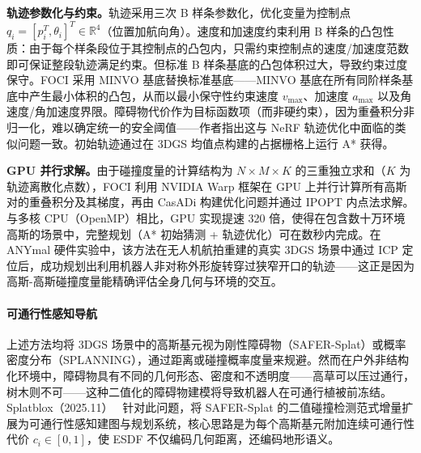 \textbf{轨迹参数化与约束。}轨迹采用三次 B 样条参数化，优化变量为控制点 $q_i = [p_i^T, \theta_i]^T \in \mathbb{R}^4$（位置加航向角）。速度和加速度约束利用 B 样条的凸包性质：由于每个样条段位于其控制点的凸包内，只需约束控制点的速度/加速度范数即可保证整段轨迹满足约束。但标准 B 样条基底的凸包体积过大，导致约束过度保守。FOCI 采用 MINVO 基底替换标准基底——MINVO 基底在所有同阶样条基底中产生最小体积的凸包，从而以最小保守性约束速度 $v_{\max}$、加速度 $a_{\max}$ 以及角速度/角加速度界限。障碍物代价作为目标函数项（而非硬约束），因为重叠积分非归一化，难以确定统一的安全阈值——作者指出这与 NeRF 轨迹优化中面临的类似问题一致。初始轨迹通过在 3DGS 均值点构建的占据栅格上运行 A* 获得。

\textbf{GPU 并行求解。}由于碰撞度量的计算结构为 $N \times M \times K$ 的三重独立求和（$K$ 为轨迹离散化点数），FOCI 利用 NVIDIA Warp 框架在 GPU 上并行计算所有高斯对的重叠积分及其梯度，再由 CasADi 构建优化问题并通过 IPOPT 内点法求解。与多核 CPU（OpenMP）相比，GPU 实现提速 320 倍，使得在包含数十万环境高斯的场景中，完整规划（A* 初始猜测 + 轨迹优化）可在数秒内完成。在 ANYmal 硬件实验中，该方法在无人机航拍重建的真实 3DGS 场景中通过 ICP 定位后，成功规划出利用机器人非对称外形旋转穿过狭窄开口的轨迹——这正是因为高斯-高斯碰撞度量能精确评估全身几何与环境的交互。

\paragraph{可通行性感知导航}

上述方法均将 3DGS 场景中的高斯基元视为刚性障碍物（SAFER-Splat）或概率密度分布（SPLANNING），通过距离或碰撞概率度量来规避。然而在户外非结构化环境中，障碍物具有不同的几何形态、密度和不透明度——高草可以压过通行，树木则不可——这种二值化的障碍物建模将导致机器人在可通行植被前冻结。Splatblox（2025.11）~\cite{2511_18525} 针对此问题，将 SAFER-Splat 的二值碰撞检测范式增量扩展为可通行性感知建图与规划系统，核心思路是为每个高斯基元附加连续可通行性代价 $c_i \in [0,1]$，使 ESDF 不仅编码几何距离，还编码地形语义。

